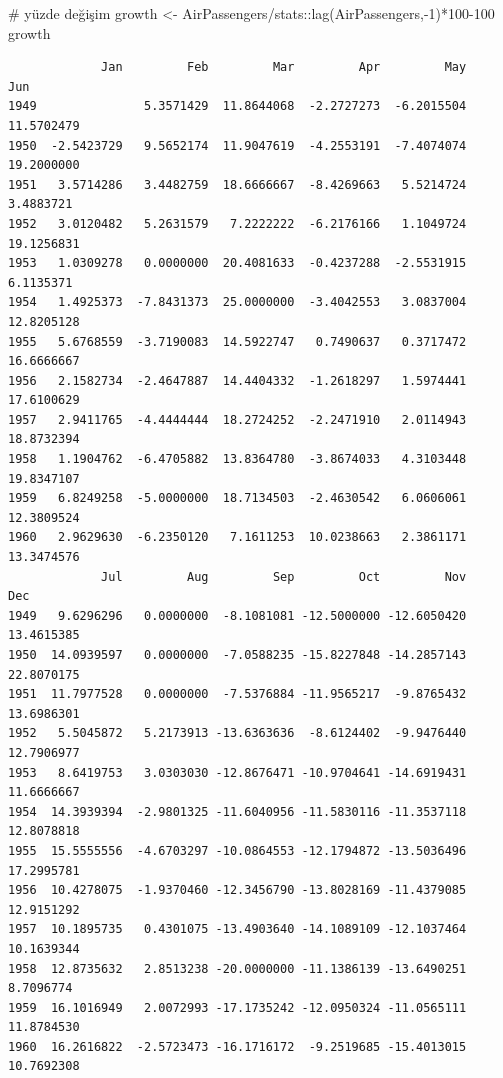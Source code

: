 \documentclass[
  letterpaper,
  DIV=11,
  numbers=noendperiod]{scrreprt}
\newenvironment{Shaded}{\begin{snugshade}}{\end{snugshade}}
\newcommand{\CommentTok}[1]{\textcolor[rgb]{0.37,0.37,0.37}{#1}}
\newcommand{\DecValTok}[1]{\textcolor[rgb]{0.68,0.00,0.00}{#1}}
\newcommand{\FunctionTok}[1]{\textcolor[rgb]{0.28,0.35,0.67}{#1}}
\newcommand{\NormalTok}[1]{\textcolor[rgb]{0.00,0.23,0.31}{#1}}
\newcommand{\OtherTok}[1]{\textcolor[rgb]{0.00,0.23,0.31}{#1}}
\newcommand{\SpecialCharTok}[1]{\textcolor[rgb]{0.37,0.37,0.37}{#1}}
\begin{document}
\begin{Shaded}
\begin{Highlighting}[]
\CommentTok{\# yüzde değişim}
\NormalTok{growth }\OtherTok{\textless{}{-}}\NormalTok{ AirPassengers}\SpecialCharTok{/}\NormalTok{stats}\SpecialCharTok{::}\FunctionTok{lag}\NormalTok{(AirPassengers,}\SpecialCharTok{{-}}\DecValTok{1}\NormalTok{)}\SpecialCharTok{*}\DecValTok{100{-}100}
\NormalTok{growth}
\end{Highlighting}
\end{Shaded}

\begin{verbatim}
             Jan         Feb         Mar         Apr         May         Jun
1949               5.3571429  11.8644068  -2.2727273  -6.2015504  11.5702479
1950  -2.5423729   9.5652174  11.9047619  -4.2553191  -7.4074074  19.2000000
1951   3.5714286   3.4482759  18.6666667  -8.4269663   5.5214724   3.4883721
1952   3.0120482   5.2631579   7.2222222  -6.2176166   1.1049724  19.1256831
1953   1.0309278   0.0000000  20.4081633  -0.4237288  -2.5531915   6.1135371
1954   1.4925373  -7.8431373  25.0000000  -3.4042553   3.0837004  12.8205128
1955   5.6768559  -3.7190083  14.5922747   0.7490637   0.3717472  16.6666667
1956   2.1582734  -2.4647887  14.4404332  -1.2618297   1.5974441  17.6100629
1957   2.9411765  -4.4444444  18.2724252  -2.2471910   2.0114943  18.8732394
1958   1.1904762  -6.4705882  13.8364780  -3.8674033   4.3103448  19.8347107
1959   6.8249258  -5.0000000  18.7134503  -2.4630542   6.0606061  12.3809524
1960   2.9629630  -6.2350120   7.1611253  10.0238663   2.3861171  13.3474576
             Jul         Aug         Sep         Oct         Nov         Dec
1949   9.6296296   0.0000000  -8.1081081 -12.5000000 -12.6050420  13.4615385
1950  14.0939597   0.0000000  -7.0588235 -15.8227848 -14.2857143  22.8070175
1951  11.7977528   0.0000000  -7.5376884 -11.9565217  -9.8765432  13.6986301
1952   5.5045872   5.2173913 -13.6363636  -8.6124402  -9.9476440  12.7906977
1953   8.6419753   3.0303030 -12.8676471 -10.9704641 -14.6919431  11.6666667
1954  14.3939394  -2.9801325 -11.6040956 -11.5830116 -11.3537118  12.8078818
1955  15.5555556  -4.6703297 -10.0864553 -12.1794872 -13.5036496  17.2995781
1956  10.4278075  -1.9370460 -12.3456790 -13.8028169 -11.4379085  12.9151292
1957  10.1895735   0.4301075 -13.4903640 -14.1089109 -12.1037464  10.1639344
1958  12.8735632   2.8513238 -20.0000000 -11.1386139 -13.6490251   8.7096774
1959  16.1016949   2.0072993 -17.1735242 -12.0950324 -11.0565111  11.8784530
1960  16.2616822  -2.5723473 -16.1716172  -9.2519685 -15.4013015  10.7692308
\end{verbatim}
\end{document}
